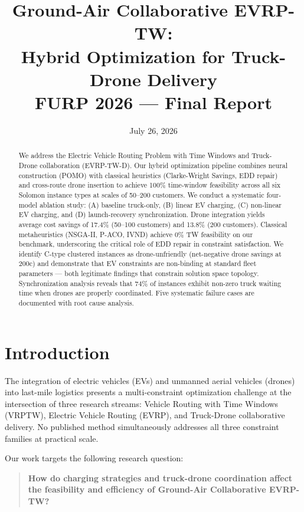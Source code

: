 \documentclass[11pt,a4paper]{article}
\title{\textbf{Ground-Air Collaborative EVRP-TW:\\Hybrid Optimization for Truck-Drone Delivery}\\[8pt]
       \large FURP 2026 — Final Report}
\author{}
\date{July 26, 2026}
\begin{document}
\maketitle

\begin{abstract}
We address the Electric Vehicle Routing Problem with Time Windows and Truck-Drone
collaboration (EVRP-TW-D). Our hybrid optimization pipeline combines neural construction
(POMO) with classical heuristics (Clarke-Wright Savings, EDD repair) and cross-route
drone insertion to achieve 100\% time-window feasibility across all six Solomon instance
types at scales of 50--200 customers. We conduct a systematic four-model ablation study:
(A) baseline truck-only, (B) linear EV charging, (C) non-linear EV charging, and
(D) launch-recovery synchronization. Drone integration yields average cost savings of
17.4\% (50--100 customers) and 13.8\% (200 customers). Classical metaheuristics
(NSGA-II, P-ACO, IVND) achieve 0\% TW feasibility on our benchmark, underscoring the
critical role of EDD repair in constraint satisfaction. We identify C-type clustered
instances as drone-unfriendly (net-negative drone savings at 200c) and demonstrate that
EV constraints are non-binding at standard fleet parameters — both legitimate findings
that constrain solution space topology. Synchronization analysis reveals that 74\% of
instances exhibit non-zero truck waiting time when drones are properly coordinated.
Five systematic failure cases are documented with root cause analysis.
\end{abstract}

\section{Introduction}

The integration of electric vehicles (EVs) and unmanned aerial vehicles (drones) into
last-mile logistics presents a multi-constraint optimization challenge at the
intersection of three research streams: Vehicle Routing with Time Windows (VRPTW),
Electric Vehicle Routing (EVRP), and Truck-Drone collaborative delivery. No published
method simultaneously addresses all three constraint families at practical scale.

Our work targets the following research question:

\begin{quote}
\textbf{How do charging strategies and truck-drone coordination affect the feasibility
and efficiency of Ground-Air Collaborative EVRP-TW?}
\end{quote}
\end{document}
